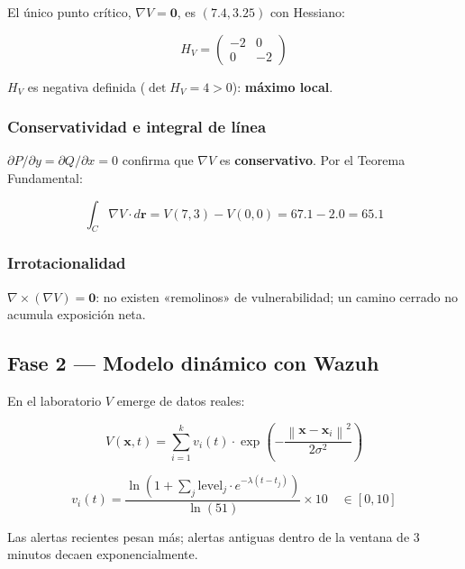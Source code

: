 \documentclass[12pt,a4paper]{article}
\newcommand{\grad}{\nabla}
\newcommand{\norm}[1]{\left\|#1\right\|}
\begin{document}
El único punto crítico, $\grad V = \mathbf{0}$, es $(7.4, 3.25)$ con Hessiano:

\begin{equation}
  H_V = \begin{pmatrix}-2 & 0 \\ 0 & -2\end{pmatrix}
\end{equation}

$H_V$ es negativa definida ($\det H_V = 4 > 0$): \textbf{máximo local}.

\subsubsection{Conservatividad e integral de línea}

$\partial P/\partial y = \partial Q/\partial x = 0$ confirma que
$\grad V$ es \textbf{conservativo}. Por el Teorema Fundamental:

\begin{equation}
  \int_C \grad V\cdot d\mathbf{r}
    = V(7,3) - V(0,0) = 67.1 - 2.0 = \mathbf{65.1}
\end{equation}

\subsubsection{Irrotacionalidad}

$\grad\times(\grad V) = \mathbf{0}$: no existen «remolinos» de
vulnerabilidad; un camino cerrado no acumula exposición neta.

\subsection{Fase 2 --- Modelo dinámico con Wazuh}

En el laboratorio $V$ emerge de datos reales:

\begin{equation}
  V(\mathbf{x},t) = \sum_{i=1}^{k} v_i(t)\cdot
  \exp\!\left(-\frac{\norm{\mathbf{x}-\mathbf{x}_i}^2}{2\sigma^2}\right)
\end{equation}

\begin{equation}
  v_i(t) = \frac{\ln\!\left(1+\displaystyle\sum_j
    \mathrm{level}_j\cdot e^{-\lambda(t-t_j)}\right)}{\ln(51)}\times 10
    \quad \in [0,10]
\end{equation}

Las alertas recientes pesan más; alertas antiguas dentro de la ventana
de 3 minutos decaen exponencialmente.
\end{document}
